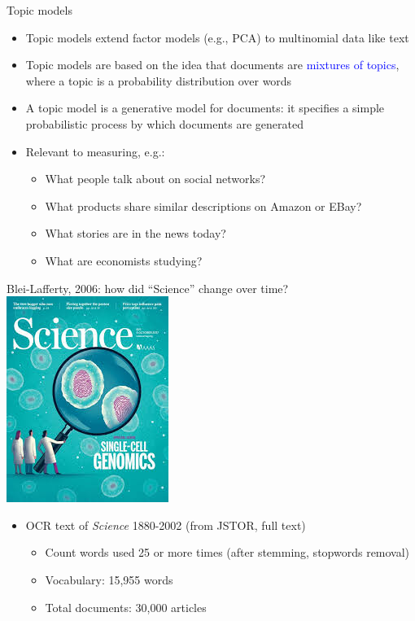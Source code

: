 \documentclass[english]{beamer}
\begin{document}
\begin{frame}{Topic models}
\begin{itemize}
\setlength{\itemsep}{0.8em}
    \item Topic models extend factor models (e.g., PCA) to multinomial data like text
    \item Topic models are based on the idea that documents are \textcolor{blue}{mixtures of topics}, where a topic is a probability distribution over words
\item A topic model is a generative model for documents: it specifies a simple probabilistic process by which documents are generated
\pause
    \item Relevant to measuring, e.g.:
     \vspace{7pt}
    \begin{itemize}
    \setlength{\itemsep}{0.8em}
        \item What people talk about on social networks?
        \item What products share similar descriptions on Amazon or EBay?
        \item What stories are in the news today?
        \item What are economists studying?
    \end{itemize}
\end{itemize}
\end{frame}
\begin{frame}{Blei-Lafferty, 2006: how did ``Science'' change over time?}
\centering
\includegraphics[width = .35 \textwidth]{Images/science.png}
\vspace{5pt}
\pause
\begin{itemize}
    \item OCR text of \textit{Science} 1880-2002 (from JSTOR, full text)
     \vspace{5pt}
    \begin{itemize}
        \setlength{\itemsep}{0.5em}
        \item Count words used 25 or more times (after stemming, stopwords removal)
        \item Vocabulary: 15,955 words
        \item Total documents: 30,000 articles
    \end{itemize}
\end{itemize}
\end{frame}
\end{document}
